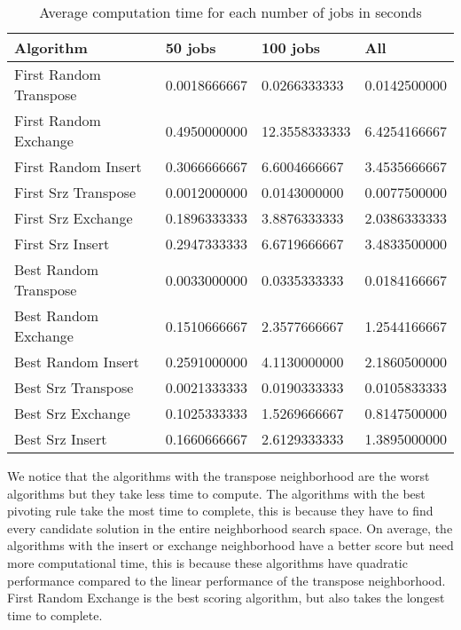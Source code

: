 \documentclass[]{article}
\begin{document}
	\begin{table}[H]
		\centering
		\caption{Average computation time for each number of jobs in seconds}
		\label{tab:table1}
		\begin{tabular}{l{|}lll}
			\toprule
			Algorithm & 50 jobs & 100 jobs & All\\
			\midrule
			First Random Transpose & 0.0018666667 & 0.0266333333 & 0.0142500000 \\ 
			First Random Exchange & 0.4950000000 & 12.3558333333 & 6.4254166667 \\  
			First Random Insert & 0.3066666667 & 6.6004666667 & 3.4535666667 \\ 
			First Srz Transpose & 0.0012000000 & 0.0143000000 & 0.0077500000 \\ 
			First Srz Exchange & 0.1896333333 & 3.8876333333 & 2.0386333333 \\
			First Srz Insert & 0.2947333333 & 6.6719666667 & 3.4833500000 \\ 
			
			Best Random Transpose & 0.0033000000 & 0.0335333333 & 0.0184166667 \\ 
			Best Random Exchange & 0.1510666667 & 2.3577666667 & 1.2544166667 \\ 
			Best Random Insert & 0.2591000000 & 4.1130000000 & 2.1860500000 \\ 
			Best Srz Transpose & 0.0021333333 & 0.0190333333 & 0.0105833333 \\ 
			Best Srz Exchange & 0.1025333333 & 1.5269666667 & 0.8147500000 \\ 
			Best Srz Insert & 0.1660666667 & 2.6129333333 & 1.3895000000 \\ 
			
			
			\bottomrule
		\end{tabular}
	\end{table}
	
	We notice that the algorithms with the transpose neighborhood are the worst algorithms but they take less time to compute.\newline
	The algorithms with the best pivoting rule take the most time to complete, this is because they have to find every candidate solution in the entire neighborhood search space.\newline
	On average, the algorithms with the insert or exchange neighborhood have a better score but need more computational time, this is because these algorithms have quadratic performance compared to the linear performance of the transpose neighborhood.
	First Random Exchange is the best scoring algorithm, but also takes the longest time to complete.
	
\end{document}
